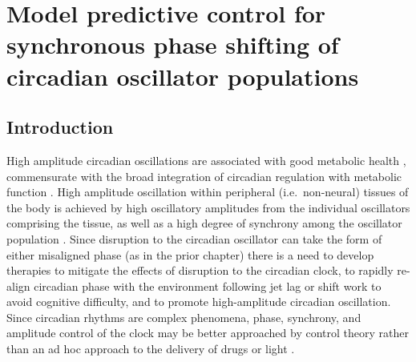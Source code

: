 

\chapter{Model predictive control for synchronous phase shifting of circadian oscillator populations}

\section{Introduction}
\label{sec:background}


High amplitude circadian oscillations are associated with good metabolic health \cite{Ramkisoensing2015}, commensurate with the broad integration of circadian regulation with metabolic function \cite{Panda2002, Bass2010}.
High amplitude oscillation within peripheral (i.e.\ non-neural) tissues of the body is achieved by high oscillatory amplitudes from the individual oscillators comprising the tissue, as well as a high degree of synchrony among the oscillator population \cite{Ukai2007,StJohn2014b,Gan2017}.
Since disruption to the circadian oscillator can take the form of either misaligned phase (as in the prior chapter) there is a need to develop therapies to mitigate the effects of disruption to the circadian clock, to rapidly re-align circadian phase with the environment following jet lag or shift work to avoid cognitive difficulty, and to promote high-amplitude circadian oscillation.
Since circadian rhythms are complex phenomena, phase, synchrony, and amplitude control of the clock may be better approached by control theory rather than an ad hoc approach to the delivery of drugs or light \cite{Bagheri2008, Serkh2014, Zhang2016}.

